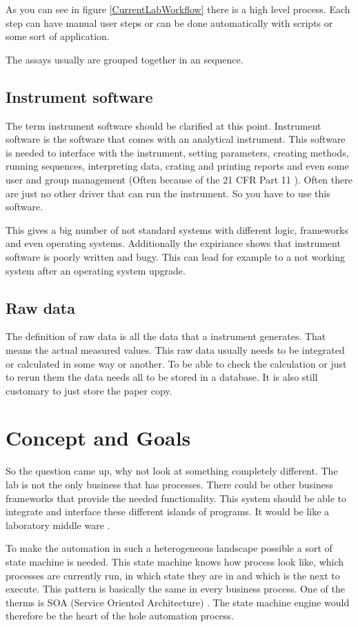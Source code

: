 \documentclass[paper=a4,twoside=false,BCOR=0mm,DIV=calc,fontsize=12pt]{scrartcl}
\begin{document}
As you can see in figure \ref{CurrentLabWorkflow} there is a high level process. Each step can have manual user steps or can be done automatically with scripts or some sort of application. 

The assays usually are grouped together in an sequence.

\subsection{Instrument software}
The term instrument software should be clarified at this point. Instrument software is the software that comes with an analytical instrument. This software is needed to interface with the instrument, setting parameters, creating methods, running sequences, interpreting data, crating and printing reports and even some user and group management (Often because of the 21 CFR Part 11 \cite{part11}). Often there are just no other driver that can run the instrument. So you have to use this software. 

This gives a big number of not standard systems with different logic, frameworks and even operating systems. Additionally the expiriance shows that instrument software is poorly written and bugy. This can lead for example to a not working system after an operating system upgrade.


\subsection{Raw data}
The definition of raw data is all the data that a instrument generates. That means the actual measured values. 
This raw data usually needs to be integrated or calculated in some way or another. To be able to check the calculation or just to rerun them the data needs all to be stored in a database. It is also still customary to just store the paper copy.

\section{Concept and Goals}
So the question came up, why not look at something completely different. The lab is not the only business that has processes. There could be other business frameworks that provide the needed functionality. This system should be able to integrate and interface these different islands of programs. It would be like a laboratory middle ware \cite{middleware}. 

To make the automation in such a heterogeneous landscape possible a sort of state machine is needed. This state machine knows how process look like, which processes are currently run, in which state they are in and which is the next to execute.
This pattern is basically the same in every business process. One of the therms is SOA (Service Oriented Architecture) \cite{soa}. The state machine engine would therefore be the heart of the hole automation process.
\end{document}
